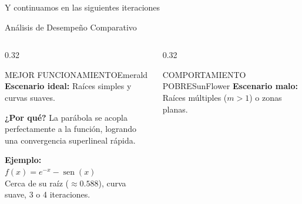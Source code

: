 \documentclass[aspectratio=169, t]{beamer}
\DeclareMathOperator{\sen}{sen}
\renewcommand{\sin}{\sen}
\begin{document}
\begin{frame}{Y continuamos en las siguientes iteraciones}
\begin{center}
    \end{center}
\end{frame}

\begin{frame}{Análisis de Desempeño Comparativo}
    \vspace{-0.2cm}
    \begin{columns}[T]
        
        \begin{column}{0.32\textwidth}
            \begin{performancebox}{MEJOR FUNCIONAMIENTO}{Emerald}
                \textbf{Escenario ideal:} Raíces simples y curvas suaves. \\ \vspace{0.1cm}
                
                \textbf{¿Por qué?} La parábola se acopla perfectamente a la función, logrando una convergencia superlineal rápida. \\ \vspace{0.1cm}
                
                \textbf{Ejemplo:} \\
                $f(x) = e^{-x} - \sin(x)$ \\
                Cerca de su raíz ($\approx 0.588$), curva suave, 3 o 4 iteraciones.
            \end{performancebox}
        \end{column}
        
        \begin{column}{0.32\textwidth}
            \begin{performancebox}{COMPORTAMIENTO POBRE}{SunFlower}
                \textbf{Escenario malo:} Raíces múltiples ($m > 1$) o zonas planas. \\ \vspace{0.1cm}
                

\end{performancebox}
\end{column}
\end{columns}
\end{frame}
\end{document}

